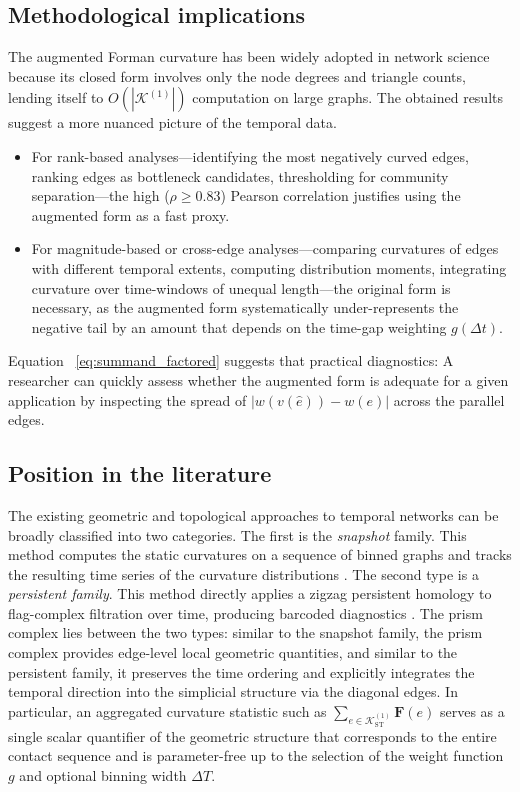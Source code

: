 \documentclass[
    pre,
    twocolumn,
    superscriptaddress,
    showpacs,
    nofootinbib,
    amsmath,
    amssymb,
    floatfix
]{revtex4-2}
\newcommand{\K}{\mathcal{K}}
\newcommand{\F}{\mathbf{F}}        %
\newcommand{\dt}{\Delta t}
\theoremstyle{plain} %
\theoremstyle{definition} %
\begin{document}
\subsection{Methodological implications}\label{ssec:methodology}

The augmented Forman curvature \cite{Sreejith2016,Samal2018} has been
widely adopted in network science because its closed form involves
only the node degrees and triangle counts, lending itself to
$O(\!|\K^{(1)}|\!)$ computation on large graphs.  The obtained results
suggest a more nuanced picture of the temporal data.
\begin{itemize}
\item For rank-based analyses---identifying the most
      negatively curved edges, ranking edges as bottleneck candidates,
      thresholding for community separation---the high
      ($\rho\geq 0.83$) Pearson correlation justifies using the
      augmented form as a fast proxy.
\item For magnitude-based or cross-edge analyses---comparing curvatures of edges with different temporal extents,
      computing distribution moments, integrating curvature over
      time-windows of unequal length---the original form is
      necessary, as the augmented form systematically
      under-represents the negative tail by an amount that depends
      on the time-gap weighting $g(\dt)$.
\end{itemize}
Equation ~\eqref{eq:summand_factored} suggests that
practical diagnostics: A researcher can quickly assess whether the
augmented form is adequate for a given application by inspecting the
spread of $|w(v(\hat e))-w(e)|$ across the parallel edges.

\subsection{Position in the literature}\label{ssec:lit_position}
The existing geometric and topological approaches to temporal networks can be broadly classified into two categories.
The first is the \emph{snapshot }family.
This method computes the static curvatures on a sequence of binned graphs and tracks the resulting time series of the curvature distributions \cite{Bhaskar2021,Wee2023}.
The second type is a \emph{persistent family}.
This method directly applies a zigzag persistent homology to flag-complex filtration over time, producing barcoded diagnostics \cite{Myers2023}.
The prism complex lies between the two types: similar to the snapshot family, the prism complex provides edge-level local geometric quantities, and similar to the persistent family, it preserves the time ordering and explicitly integrates the temporal direction into the simplicial structure via the diagonal edges.
In particular, an aggregated curvature statistic such as $\sum_{e\in\K_{\mathrm{ST}}^{(1)}}\F(e)$ serves as a single scalar quantifier of the geometric structure that corresponds to the entire contact sequence and is parameter-free up to the selection of the weight function $g$ and optional binning width $\Delta T$.
\end{document}
